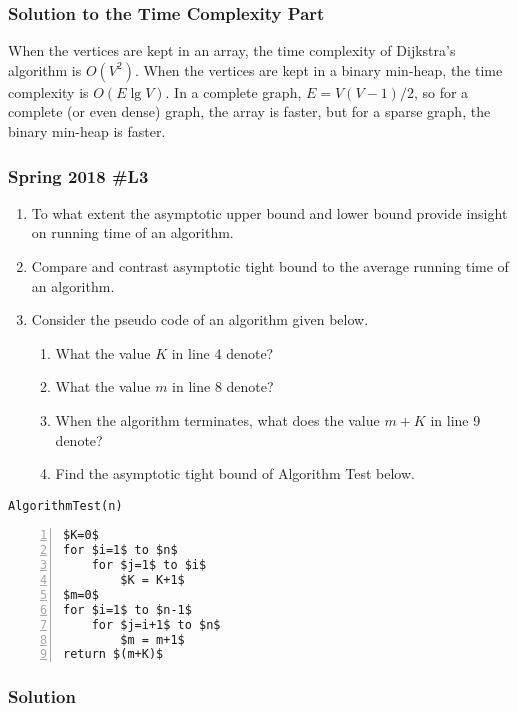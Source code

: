 \subsubsection{Solution to the Time Complexity Part}

When the vertices are kept in an array, the time complexity of Dijkstra's algorithm is $O(V^2)$.  When the vertices are kept in a binary min-heap, the time complexity is $O(E \lg V)$.  In a complete graph, $E = V(V-1)/2$, so for a complete (or even dense) graph, the array is faster, but for a sparse graph, the binary min-heap is faster.  

\subsubsection{Spring 2018 \#L3}

	\begin{enumerate}[label=\alph*.]
		\item To what extent the asymptotic upper bound and lower bound provide insight on running time of an algorithm.
		\item Compare and contrast asymptotic tight bound to the average running time of an algorithm.
		\item Consider the pseudo code of an algorithm given below.  
		\begin{enumerate}
			\item What the value $K$ in line 4 denote?
			\item What the value $m$ in line 8 denote?
			\item When the algorithm terminates, what does the value $m+K$ in line 9 denote?
			\item Find the asymptotic tight bound of Algorithm Test below.
		\end{enumerate}
	\end{enumerate}
	
	\verb|AlgorithmTest(n)|
	
	\begin{lstlisting}[mathescape=True, numbers=left]
$K=0$
for $i=1$ to $n$
	for $j=1$ to $i$
		$K = K+1$
$m=0$
for $i=1$ to $n-1$
	for $j=i+1$ to $n$
		$m = m+1$
return $(m+K)$
	\end{lstlisting}

\subsubsection{Solution}

